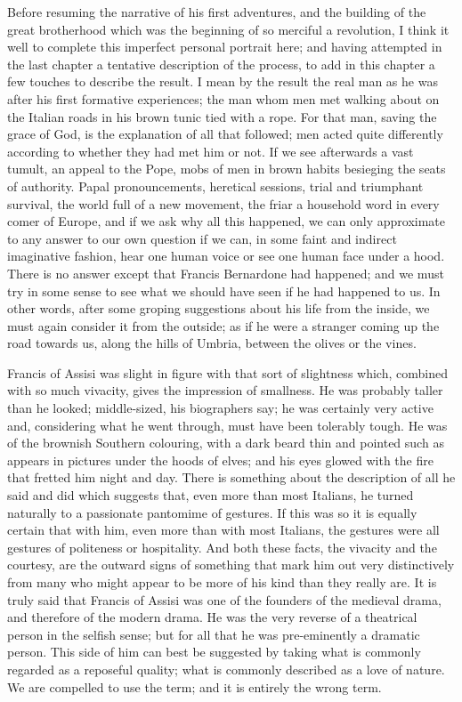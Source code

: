 \documentclass{book}
\begin{document}
Before resuming the narrative of his first adventures, and the building of the great brotherhood which was the beginning of so merciful a revolution, I think it well to complete this imperfect personal portrait here; and having attempted in the last chapter a tentative description of the process, to add in this chapter a few touches to describe the result. I mean by the result the real man as he was after his first formative experiences; the man whom men met walking about on the Italian roads in his brown tunic tied with a rope. For that man, saving the grace of God, is the explanation of all that followed; men acted quite differently according to whether they had met him or not. If we see afterwards a vast tumult, an appeal to the Pope, mobs of men in brown habits besieging the seats of authority. Papal pronouncements, heretical sessions, trial and triumphant survival, the world full of a new movement, the friar a household word in every comer of Europe, and if we ask why all this happened, we can only approximate to any answer to our own question if we can, in some faint and indirect imaginative fashion, hear one human voice or see one human face under a hood. There is no answer except that Francis Bernardone had happened; and we must try in some sense to see what we should have seen if he had happened to us. In other words, after some groping suggestions about his life from the inside, we must again consider it from the outside; as if he were a stranger coming up the road towards us, along the hills of Umbria, between the olives or the vines.

Francis of Assisi was slight in figure with that sort of slightness which, combined with so much vivacity, gives the impression of smallness. He was probably taller than he looked; middle-sized, his biographers say; he was certainly very active and, considering what he went through, must have been tolerably tough. He was of the brownish Southern colouring, with a dark beard thin and pointed such as appears in pictures under the hoods of elves; and his eyes glowed with the fire that fretted him night and day. There is something about the description of all he said and did which suggests that, even more than most Italians, he turned naturally to a passionate pantomime of gestures. If this was so it is equally certain that with him, even more than with most Italians, the gestures were all gestures of politeness or hospitality. And both these facts, the vivacity and the courtesy, are the outward signs of something that mark him out very distinctively from many who might appear to be more of his kind than they really are. It is truly said that Francis of Assisi was one of the founders of the medieval drama, and therefore of the modern drama. He was the very reverse of a theatrical person in the selfish sense; but for all that he was pre-eminently a dramatic person. This side of him can best be suggested by taking what is commonly regarded as a reposeful quality; what is commonly described as a love of nature. We are compelled to use the term; and it is entirely the wrong term.
\end{document}
